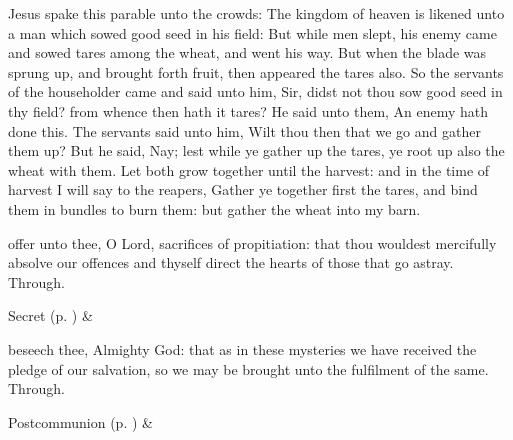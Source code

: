 

 Jesus spake this parable unto the crowds: The kingdom of heaven is likened unto a man which sowed good seed in his field: But while men slept, his enemy came and sowed tares among the wheat, and went his way. But when the blade was sprung up, and brought forth fruit, then appeared the tares also. So the servants of the householder came and said unto him, Sir, didst not thou sow good seed in thy field? from whence then hath it tares? He said unto them, An enemy hath done this. The servants said unto him, Wilt thou then that we go and gather them up? But he said, Nay; lest while ye gather up the tares, ye root up also the wheat with them. Let both grow together until the harvest: and in the time of harvest I will say to the reapers, Gather ye together first the tares, and bind them in bundles to burn them: but gather the wheat into my barn.


\secret\label{EpiphanyVSecret}
 offer unto thee, O Lord, sacrifices of propitiation: that thou wouldest mercifully absolve our offences and thyself direct the hearts of those that go astray. Through.
\begin{rubric}
     Secret  (p. \pageref{SPSaints}) \&  
\end{rubric}


\postcommunion\label{EpiphanyVPostcommunion}
 beseech thee, Almighty God: that as in these mysteries we have received the pledge of our salvation, so we may be brought unto the fulfilment of the same. Through.
\begin{rubric}
     Postcommunion  (p. \pageref{SPSaints}) \&  
\end{rubric}


